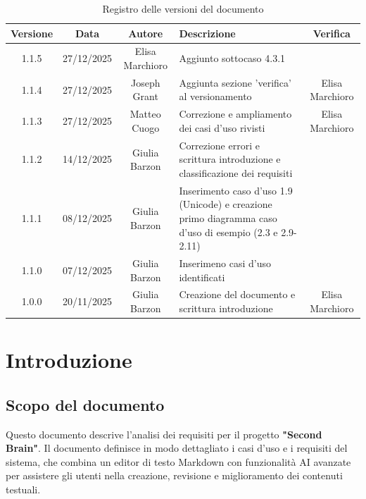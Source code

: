 \documentclass[11pt,a4paper]{article}
\begin{document}
\begin{table}[H]
    \centering
    \begin{tabular}{|c|c|c|>{\raggedright\arraybackslash}p{}|c|}
        \hline
        \textbf{Versione} & \textbf{Data} & \textbf{Autore} & \textbf{Descrizione} & \textbf{Verifica} \\
        \hline
        1.1.5 & 27/12/2025 & Elisa Marchioro & Aggiunto sottocaso 4.3.1 & \\ \hline
        1.1.4 & 27/12/2025 & Joseph Grant & Aggiunta sezione 'verifica' al versionamento & Elisa Marchioro\\ \hline
        1.1.3 & 27/12/2025 & Matteo Cuogo & Correzione e ampliamento dei casi d'uso rivisti & Elisa Marchioro\\
        \hline
        1.1.2 & 14/12/2025 & Giulia Barzon & Correzione errori e scrittura introduzione e classificazione dei requisiti &\\
        \hline
        1.1.1 & 08/12/2025 & Giulia Barzon & Inserimento caso d'uso 1.9 (Unicode) e creazione primo diagramma caso d'uso di esempio (2.3 e 2.9-2.11) &\\
        \hline
        1.1.0 & 07/12/2025 & Giulia Barzon & Inserimeno casi d'uso identificati & \\
        \hline
        1.0.0 & 20/11/2025 & Giulia Barzon & Creazione del documento e scrittura introduzione & Elisa Marchioro\\
        \hline
    \end{tabular}
    \caption{Registro delle versioni del documento}
    \label{tab:versionamento}
\end{table}

\newpage

\tableofcontents
\thispagestyle{empty}
\newpage

\setcounter{page}{1}

\section{Introduzione}
\subsection{Scopo del documento}
Questo documento descrive l'analisi dei requisiti per il progetto \textbf{"Second Brain"}. Il documento definisce in modo dettagliato i casi d'uso e i requisiti del sistema, che combina un editor di testo Markdown con funzionalità AI avanzate per assistere gli utenti nella creazione, revisione e miglioramento dei contenuti testuali.
\end{document}
